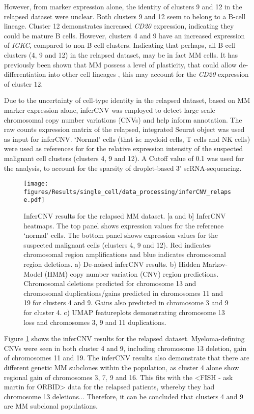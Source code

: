 However, from marker expression alone, the identity of clusters 9 and 12 in the relapsed dataset were unclear.
Both clusters 9 and 12 seem to belong to a B-cell lineage.
Cluster 12 demonstrates increased \textit{CD20} expression, indicating they could be mature B cells.
However, clusters 4 and 9 have an increased expression of \textit{IGKC}, compared to non-B cell clusters.
Indicating that perhaps, all B-cell clusters (4, 9 and 12) in the relapsed dataset, may be in fact MM cells.
It has previously been shown that MM possess a level of plasticity, that could allow de-differentiation into other cell lineages \cite{kotouvcek2014myeloma}, this may account for the \textit{CD20} expression of cluster 12.

Due to the uncertainty of cell-type identity in the relapsed dataset, based on MM marker expression alone, inferCNV \cite{patel2014single, infercnv2014} was employed to detect large-scale chromosomal copy number variations (CNVs) and help inform annotation.
The raw counts expression matrix of the relapsed, integrated Seurat object was used as input for inferCNV\@.
`Normal' cells (that is: myeloid cells, T cells and NK cells) were used as references for for the relative expression intensity of the suspected malignant cell clusters (clusters 4, 9 and 12).
A Cutoff value of 0.1 was used for the analysis, to account for the sparsity of droplet-based 3' scRNA-sequencing.
%
\begin{figure}[htb]
    \centering
    \texttt{[image: figures/Results/single\_cell/data\_processing/inferCNV\_relapse.pdf]}
    \caption[inferCNV- relapsed MM]{InferCNV results for the relapsed MM dataset.
    [a and b] InferCNV heatmaps.
        The top panel shows expression values for the reference `normal' cells.
        The bottom panel shows expression values for the suspected malignant cells (clusters 4, 9 and 12).
        Red indicates chromosomal region amplifications and blue indicates chromosomal region deletions.
    a) De-noised inferCNV results.
    b) Hidden Markov-Model (HMM) copy number variation (CNV) region predictions.
        Chromosomal deletions predicted for chromosome 13 and chromosomal duplications/gains predicted in chromosomes 11 and 19 for clusters 4 and 9.
        Gains also predicted in chromosome 3 and 9 for cluster 4.
    c) UMAP featureplots demonstrating chromosome 13 loss and chromosomes 3, 9 and 11 duplications.
    }
    \label{fig:inferCNV_relapse}
\end{figure}
%
Figure \ref{fig:inferCNV_relapse} shows the inferCNV results for the relapsed dataset.
Myeloma-defining CNVs were seen in both cluster 4 and 9, including chromosome 13 deletion, gain of chromosomes 11 and 19.
The inferCNV results also demonstrate that there are different genetic MM subclones within the population, as cluster 4 alone show regional gain of chromosomes 3, 7, 9 and 16.
This fits with the <FISH - ask martin for ORBID> data for the relapsed patients, whereby they had chromosome 13 deletions...
Therefore, it can be concluded that clusters 4 and 9 are MM subclonal populations.

